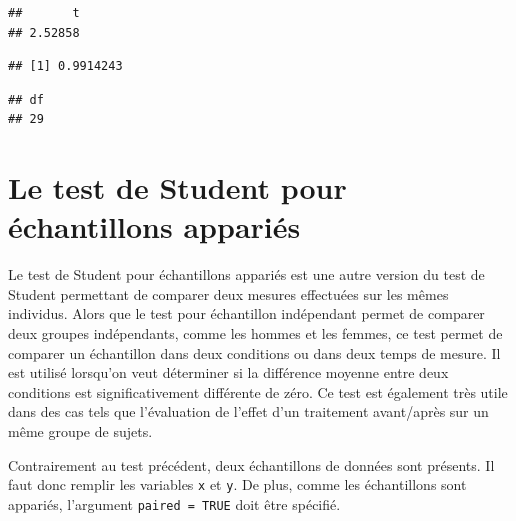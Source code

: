 \documentclass[
]{book}
\newenvironment{Shaded}{\begin{snugshade}}{\end{snugshade}}
\newcommand{\NormalTok}[1]{#1}
\newcommand{\SpecialCharTok}[1]{\textcolor[rgb]{0.81,0.36,0.00}{\textbf{#1}}}
\begin{document}
\begin{Shaded}
\end{Shaded}

\begin{verbatim}
##       t 
## 2.52858
\end{verbatim}

\begin{Shaded}
\end{Shaded}

\begin{verbatim}
## [1] 0.9914243
\end{verbatim}

\begin{Shaded}
\end{Shaded}

\begin{verbatim}
## df 
## 29
\end{verbatim}

\section{Le test de Student pour échantillons appariés}\label{le-test-de-student-pour-uxe9chantillons-appariuxe9s}

Le test de Student pour échantillons appariés est une autre version du test de Student permettant de comparer deux mesures effectuées sur les mêmes individus. Alors que le test pour échantillon indépendant permet de comparer deux groupes indépendants, comme les hommes et les femmes, ce test permet de comparer un échantillon dans deux conditions ou dans deux temps de mesure. Il est utilisé lorsqu'on veut déterminer si la différence moyenne entre deux conditions est significativement différente de zéro. Ce test est également très utile dans des cas tels que l'évaluation de l'effet d'un traitement avant/après sur un même groupe de sujets.

Contrairement au test précédent, deux échantillons de données sont présents. Il faut donc remplir les variables \texttt{x} et \texttt{y}. De plus, comme les échantillons sont appariés, l'argument \texttt{paired\ =\ TRUE} doit être spécifié.
\end{document}
